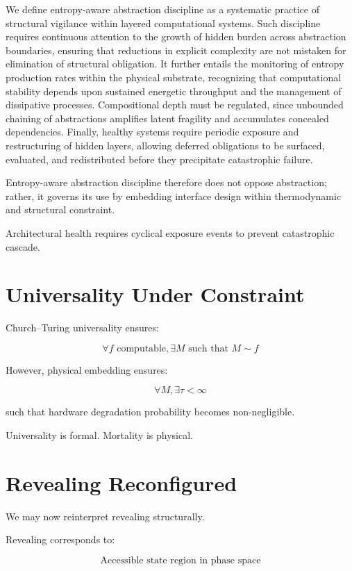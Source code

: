 \documentclass[11pt,openany]{book}
\begin{document}
We define entropy-aware abstraction discipline as a systematic practice of 
structural vigilance within layered computational systems. Such discipline 
requires continuous attention to the growth of hidden burden across abstraction 
boundaries, ensuring that reductions in explicit complexity are not mistaken 
for elimination of structural obligation. It further entails the monitoring of 
entropy production rates within the physical substrate, recognizing that 
computational stability depends upon sustained energetic throughput and the 
management of dissipative processes. Compositional depth must be regulated, 
since unbounded chaining of abstractions amplifies latent fragility and 
accumulates concealed dependencies. Finally, healthy systems require periodic 
exposure and restructuring of hidden layers, allowing deferred obligations to 
be surfaced, evaluated, and redistributed before they precipitate catastrophic 
failure. 

Entropy-aware abstraction discipline therefore does not oppose abstraction; 
rather, it governs its use by embedding interface design within thermodynamic 
and structural constraint.


Architectural health requires cyclical exposure events
to prevent catastrophic cascade.

\section{Universality Under Constraint}

Church--Turing universality ensures:

\[
\forall f \text{ computable}, \exists M \text{ such that } M \sim f
\]

However, physical embedding ensures:

\[
\forall M, \exists \tau < \infty
\]

such that hardware degradation probability becomes non-negligible.

Universality is formal.
Mortality is physical.

\section{Revealing Reconfigured}

We may now reinterpret revealing structurally.

Revealing corresponds to:

\[
\text{Accessible state region in phase space}
\]
\end{document}
